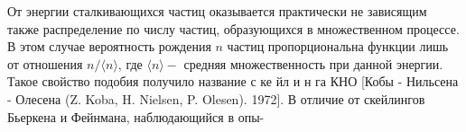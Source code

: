 \documentclass[10pt]{article}
\begin{document}
От энергии сталкивающихся частиц оказывается практически не зависящим также распределение по числу частиц, образующихся в множественном процессе. В этом случае вероятность рождения $n$ частиц пропорциональна функции лишь от отношения $n /\langle n\rangle$, где $\langle n\rangle-$ средняя множественность при данной энергии. Такое свойство подобия получило название с ке йл и н га КНО [Кобы - Нильсена - Олесена (Z. Koba, H. Nielsen, P. Olesen). 1972]. В отличие от скейлингов Бьеркена и Фейнмана, наблюдающийся в опы-
\end{document}
